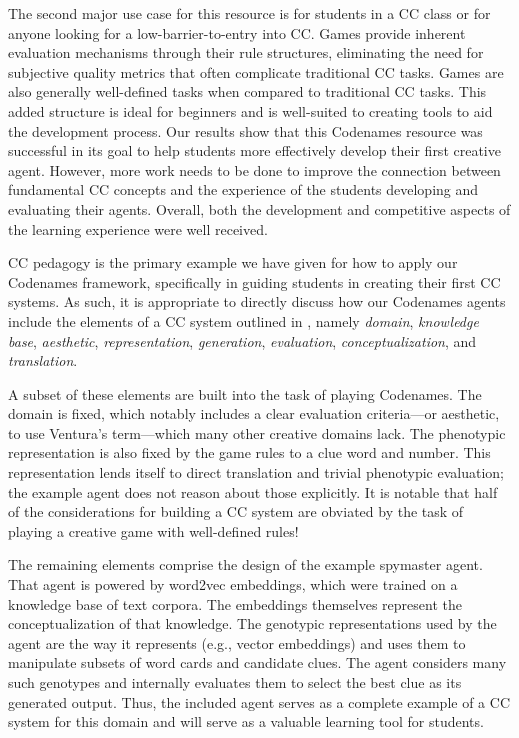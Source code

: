 \documentclass[phd,electronic,oneside,twosidetoc,letterpaper,chaptercenter,parttop,lof]{byumsphd}
\begin{document}
The second major use case for this resource is for students in a CC class or for anyone looking for a low-barrier-to-entry into CC. Games provide inherent evaluation mechanisms through their rule structures, eliminating the need for subjective quality metrics that often complicate traditional CC tasks. Games are also generally well-defined tasks when compared to traditional CC tasks. This added structure is ideal for beginners and is well-suited to creating tools to aid the development process. Our results show that this Codenames resource was successful in its goal to help students more effectively develop their first creative agent. However, more work needs to be done to improve the connection between fundamental CC concepts and the experience of the students developing and evaluating their agents. Overall, both the development and competitive aspects of the learning experience were well received.

CC pedagogy is the primary example we have given for how to apply our Codenames framework, specifically in guiding students in creating their first CC systems. As such, it is appropriate to directly discuss how our Codenames agents include the elements of a CC system outlined in \cite{ventura2017howto}, namely \emph{domain}, \emph{knowledge base}, \emph{aesthetic}, \emph{representation}, \emph{generation}, \emph{evaluation}, \emph{conceptualization}, and \emph{translation}.

A subset of these elements are built into the task of playing Codenames. The domain is fixed, which notably includes a clear evaluation criteria---or aesthetic, to use Ventura's term---which many other creative domains lack. The phenotypic representation is also fixed by the game rules to a clue word and number. This representation lends itself to direct translation and trivial phenotypic evaluation; the example agent does not reason about those explicitly. It is notable that half of the considerations for building a CC system are obviated by the task of playing a creative game with well-defined rules!

The remaining elements comprise the design of the example spymaster agent. That agent is powered by word2vec embeddings, which were trained on a knowledge base of text corpora. The embeddings themselves represent the conceptualization of that knowledge. The genotypic representations used by the agent are the way it represents (e.g., vector embeddings) and uses them to manipulate subsets of word cards and candidate clues. The agent considers many such genotypes and internally evaluates them to select the best clue as its generated output. Thus, the included agent serves as a complete example of a CC system for this domain and will serve as a valuable learning tool for students.
\end{document}
